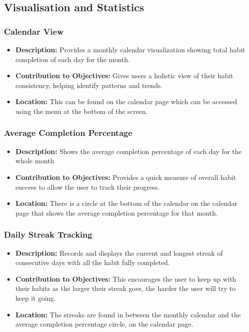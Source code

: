 \subsection{Visualisation and Statistics}
\subsubsection{Calendar View}
\begin{itemize}
    \item \textbf{Description:} Provides a monthly calendar visualization showing total habit completion of each day for the month.
    \item \textbf{Contribution to Objectives:} Gives users a holistic view of their habit consistency, helping identify patterns and trends.
    \item \textbf{Location:} This can be found on the calendar page which can be accessed using the menu at the bottom of the screen.
\end{itemize}

\subsubsection{Average Completion Percentage}
\begin{itemize}
    \item \textbf{Description:} Shows the average completion percentage of each day for the whole month
    \item \textbf{Contribution to Objectives:} Provides a quick measure of overall habit success to allow the user to track their progress.
    \item \textbf{Location:} There is a circle at the bottom of the calendar on the calendar page that shows the average completion percentage for that month.
\end{itemize}

\subsubsection{Daily Streak Tracking}
\begin{itemize}
    \item \textbf{Description:} Records and displays the current and longest streak of consecutive days with all the habit fully completed.
    \item \textbf{Contribution to Objectives:} This encourages the user to keep up with their habits as the larger their streak goes, the harder the user will try to keep it going.
    \item \textbf{Location:} The streaks are found in between the monthly calendar and the average completion percentage circle, on the calendar page.
\end{itemize}

